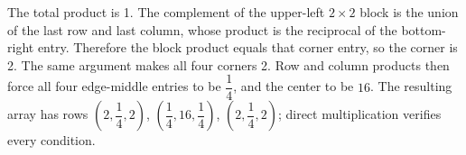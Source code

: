 The total product is 1. The complement of the upper-left $2\times2$ block is the union of the last row and last column, whose product is the reciprocal of the bottom-right entry. Therefore the block product equals that corner entry, so the corner is 2. The same argument makes all four corners 2. Row and column products then force all four edge-middle entries to be $\dfrac{1}{4}$, and the center to be $\boxed{16}$. The resulting array has rows $(2,\dfrac{1}{4},2)$, $(\dfrac{1}{4},16,\dfrac{1}{4})$, $(2,\dfrac{1}{4},2)$; direct multiplication verifies every condition.
